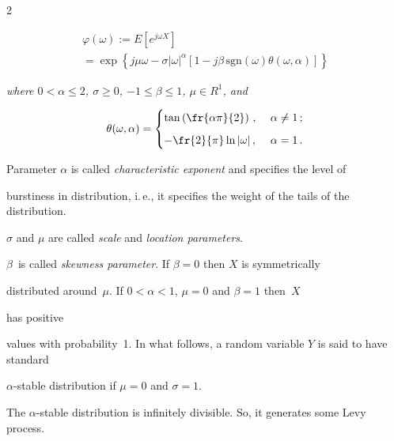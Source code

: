 \begin{multicols}{2}
\noindent

\begin{multline*}

\varphi (\omega ) := E\left[ e^{j\omega X} \right] \\

{}=

\exp \left\{ j\mu\omega - \sigma |\omega |^{\alpha} [1 - j \beta\, \mbox{sgn}\left(\omega \right) 

\theta (\omega , \alpha )] \right\}  

\end{multline*}

\textit{where $0< \alpha \leq 2$, $\sigma\geq 0$, $-1 \leq \beta \leq 1$, $\mu\in R^1$, and} 

$$

\theta (\omega , \alpha ) = 

\begin{cases}

\tan \left( \fr{\alpha \pi }{2} \right)\,, &\ \alpha \not= 1\,; \\[6pt]

-\fr{2}{\pi} \ln |\omega |\,,  &\ \alpha =1\,. 

\end{cases}

$$





\smallskip



Parameter $\alpha$ is called {\it characteristic exponent} and specifies the level of 

burstiness in distribution, i.\,e., it specifies the weight of the tails of the distribution. 

$\sigma$ and $\mu$ are called {\it scale} and {\it location parameters}. 

$\beta$~is called {\it skewness parameter}. If $\beta =0$ then $X$ is symmetrically 

distributed around~$\mu$. If $0<\alpha <1$, $\mu =0$ and $\beta =1$ then~$X$ 

has positive 

values with probability~1. In what follows, a random variable $Y$ is said to have  standard 

$\alpha$-stable distribution if $\mu =0$ and $\sigma = 1$. 



The $\alpha$-stable distribution is infinitely divisible. So, it generates some Levy process. 




\end{multicols}
